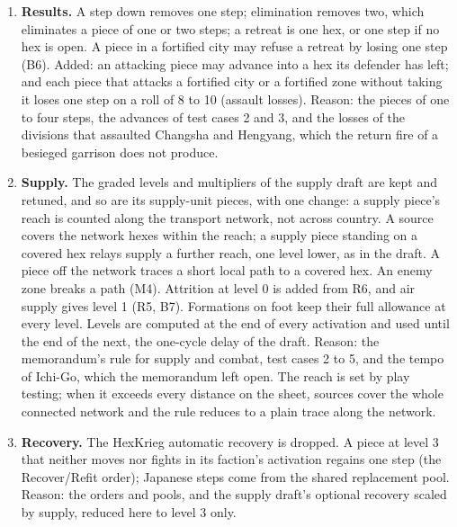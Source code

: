 \documentclass[11pt]{article}
\begin{document}
\begin{enumerate}[label=M\arabic*.,leftmargin=*,itemsep=3pt]
\item \textbf{Results.} A step down removes one step; elimination removes two, which eliminates a piece of one or two steps; a retreat is one hex, or one step if no hex is open. A piece in a fortified city may refuse a retreat by losing one step (B6). Added: an attacking piece may advance into a hex its defender has left; and each piece that attacks a fortified city or a fortified zone without taking it loses one step on a roll of 8 to 10 (assault losses). Reason: the pieces of one to four steps, the advances of test cases 2 and 3, and the losses of the divisions that assaulted Changsha and Hengyang, which the return fire of a besieged garrison does not produce.
\item \textbf{Supply.} The graded levels and multipliers of the supply draft are kept and retuned, and so are its supply-unit pieces, with one change: a supply piece's reach is counted along the transport network, not across country. A source covers the network hexes within the reach; a supply piece standing on a covered hex relays supply a further reach, one level lower, as in the draft. A piece off the network traces a short local path to a covered hex. An enemy zone breaks a path (M4). Attrition at level 0 is added from R6, and air supply gives level 1 (R5, B7). Formations on foot keep their full allowance at every level. Levels are computed at the end of every activation and used until the end of the next, the one-cycle delay of the draft. Reason: the memorandum's rule for supply and combat, test cases 2 to 5, and the tempo of Ichi-Go, which the memorandum left open. The reach is set by play testing; when it exceeds every distance on the sheet, sources cover the whole connected network and the rule reduces to a plain trace along the network.
\item \textbf{Recovery.} The HexKrieg automatic recovery is dropped. A piece at level 3 that neither moves nor fights in its faction's activation regains one step (the Recover/Refit order); Japanese steps come from the shared replacement pool. Reason: the orders and pools, and the supply draft's optional recovery scaled by supply, reduced here to level 3 only.
\end{enumerate}
\end{document}
